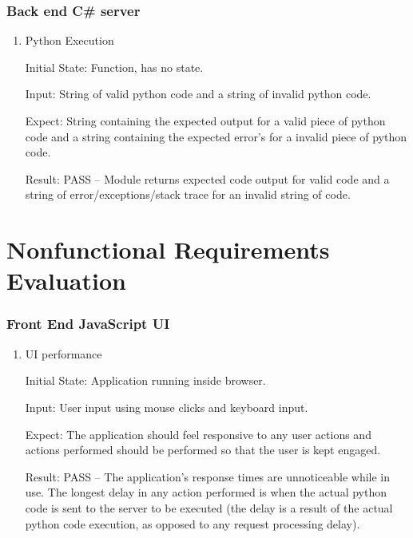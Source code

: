 \documentclass[12pt, titlepage]{article}
\begin{document}
  \subsubsection{Back end C\# server}

    \begin{enumerate}

    \item{Python Execution\\} \label{exec}

    Initial State: Function, has no state.

    Input: String of valid python code and a string of invalid python code.

    Expect: String containing the expected output for a valid piece of python code
			and a string containing the expected error's for a invalid piece of python code.
              
		Result: PASS -- Module returns expected code output for valid code and a
		string of error/exceptions/stack trace for an invalid string of code.
              
    \end{enumerate}


\section{Nonfunctional Requirements Evaluation}

  \subsubsection{Front End JavaScript UI}

    \begin{enumerate}

    \item{UI performance\\} \label{ui}

    Initial State: Application running inside browser.

    Input: User input using mouse clicks and keyboard input.

    Expect: The application should feel responsive to any user actions and
		 actions performed should be performed so that the user is kept engaged.
              
		Result: PASS -- The application's response times are unnoticeable while in
		use. The longest delay in any action performed is when the actual python
		code is sent to the server to be executed (the delay is a result of the actual
		python code execution, as opposed to any request processing delay).

		\end{enumerate}
              
\end{document}
